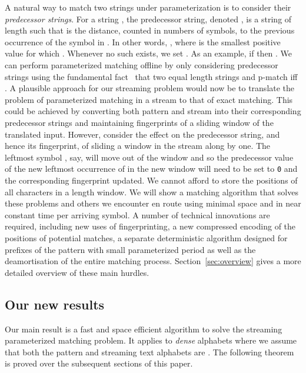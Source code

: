 \documentclass[11pt,a4paper]{article}
\theoremstyle{theorem}
\newcommand{\pmatch}{\mbox{p-match}\xspace}
\begin{document}
A natural way to match two strings under parameterization is to consider
their \emph{predecessor strings}. For a string , the predecessor
string, denoted , is a string of length  such that
 is the distance, counted in numbers of symbols, to the
previous occurrence of the symbol  in . In other words,
, where  is the smallest positive value for
which . Whenever no such  exists, we set
.
As an example, if  then .
We can perform parameterized matching offline by only considering predecessor strings using the fundamental fact~\cite{Baker:1993} that two equal length strings  and  \pmatch iff .
A plausible approach for our streaming problem would now be to
translate the problem of parameterized matching in a stream to that of
exact matching.  This could be achieved by converting both pattern and
stream into their corresponding predecessor strings and maintaining
fingerprints of a sliding window of the translated input. However,
consider the effect on the predecessor string, and hence its
fingerprint, of sliding a window in the stream along by one.  The
leftmost symbol , say, will move out of the window and so the
predecessor value of the new leftmost occurrence of  in the new
window will need to be set to \texttt{0} and the corresponding fingerprint
updated. We cannot afford to store the positions of all
characters in a  length window. 
We will show a matching algorithm that solves these problems and others we
encounter en route using minimal space and in near constant time per arriving symbol. A number of technical innovations are required, including new uses of fingerprinting, a new compressed encoding of the positions of potential matches, a separate deterministic algorithm designed  for prefixes of the pattern with small parameterized period as well as the deamortisation of the entire matching process. Section~\ref{sec:overview} gives a more detailed overview of these main hurdles.









\subsection{Our new results}\label{sec:newresults}

Our main result is a fast and space efficient algorithm to solve the streaming parameterized matching problem.
It applies to \emph{dense} alphabets where we assume that both the pattern and streaming text alphabets are . The following theorem is proved over the subsequent sections of this paper.
\end{document}
